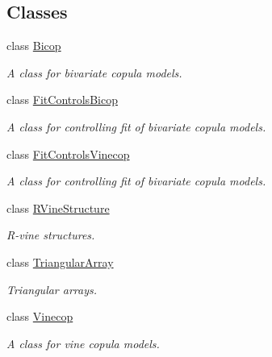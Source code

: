 \subsection*{Classes}
\begin{DoxyCompactItemize}
\item 
class \hyperlink{classvinecopulib_1_1_bicop}{Bicop}
\begin{DoxyCompactList}\small\item\em A class for bivariate copula models. \end{DoxyCompactList}\item 
class \hyperlink{classvinecopulib_1_1_fit_controls_bicop}{Fit\+Controls\+Bicop}
\begin{DoxyCompactList}\small\item\em A class for controlling fit of bivariate copula models. \end{DoxyCompactList}\item 
class \hyperlink{classvinecopulib_1_1_fit_controls_vinecop}{Fit\+Controls\+Vinecop}
\begin{DoxyCompactList}\small\item\em A class for controlling fit of bivariate copula models. \end{DoxyCompactList}\item 
class \hyperlink{classvinecopulib_1_1_r_vine_structure}{R\+Vine\+Structure}
\begin{DoxyCompactList}\small\item\em R-\/vine structures. \end{DoxyCompactList}\item 
class \hyperlink{classvinecopulib_1_1_triangular_array}{Triangular\+Array}
\begin{DoxyCompactList}\small\item\em Triangular arrays. \end{DoxyCompactList}\item 
class \hyperlink{classvinecopulib_1_1_vinecop}{Vinecop}
\begin{DoxyCompactList}\small\item\em A class for vine copula models. \end{DoxyCompactList}\end{DoxyCompactItemize}
